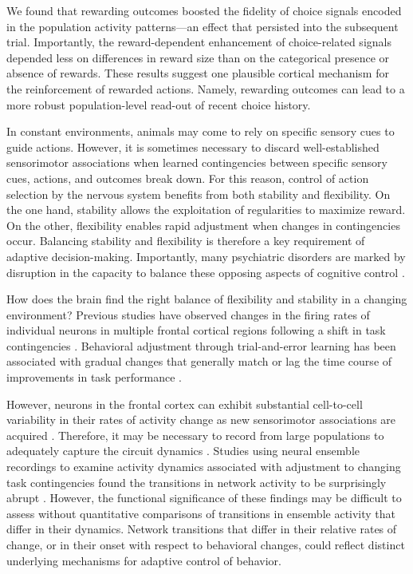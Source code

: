 We found that rewarding outcomes boosted the fidelity of choice signals encoded in the population activity patterns---an effect that persisted into the subsequent trial. Importantly, the reward-dependent enhancement of choice-related signals depended less on differences in reward size than on the categorical presence or absence of rewards. These results suggest one plausible cortical mechanism for the reinforcement of rewarded actions. Namely, rewarding outcomes can lead to a more robust population-level read-out of recent choice history.


In constant environments, animals may come to rely on specific sensory cues to guide actions. However, it is sometimes necessary to discard well-established sensorimotor associations when learned contingencies between specific sensory cues, actions, and outcomes break down. For this reason, control of action selection by the nervous system benefits from both stability and flexibility. On the one hand, stability allows the exploitation of regularities to maximize reward. On the other, flexibility enables rapid adjustment when changes in contingencies occur. Balancing stability and flexibility is therefore a key requirement of adaptive decision-making. Importantly, many psychiatric disorders are marked by disruption in the capacity to balance these opposing aspects of cognitive control \citep{griffiths2014translational}.  

How does the brain find the right balance of flexibility and stability in a changing environment? Previous studies have observed changes in the firing rates of individual neurons in multiple frontal cortical regions following a shift in task contingencies \citep{asaad2000task,rich2009rat,rodgers2014neural}. Behavioral adjustment through trial-and-error learning has been associated with gradual changes that generally match or lag the time course of improvements in task performance \citep{mitz1991learning,chen1995neuronal,pasupathy2005different,antzoulatos2011differences}. 

However, neurons in the frontal cortex can exhibit substantial cell-to-cell variability in their rates of activity change as new sensorimotor associations are acquired \citep{mitz1991learning}. Therefore, it may be necessary to record from large populations to adequately capture the circuit dynamics \citep{mante2013context}. Studies using neural ensemble recordings to examine activity dynamics associated with adjustment to changing task contingencies found the transitions in network activity to be surprisingly abrupt \citep{durstewitz2010abrupt,karlsson2012network}. However, the functional significance of these findings may be difficult to assess without quantitative comparisons of transitions in ensemble activity that differ in their dynamics. Network transitions that differ in their relative rates of change, or in their onset with respect to behavioral changes, could reflect distinct underlying mechanisms for adaptive control of behavior.

